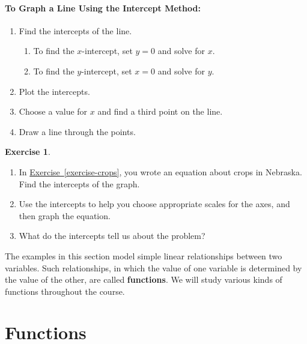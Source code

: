 \documentclass[10pt,]{book}
\newcommand{\terminology}[1]{\textbf{#1}}
\theoremstyle{plain}
\theoremstyle{definition}
\theoremstyle{definition}
\theoremstyle{definition}
\theoremstyle{definition}
\theoremstyle{definition}
\newtheorem{exercise}[theorem]{Exercise}
\numberwithin{equation}{section}
\begin{document}
\paragraph[To Graph a Line Using the Intercept Method:]{To Graph a Line Using the Intercept Method:}\label{paragraphs-4}
\leavevmode%
\begin{enumerate}[label=*\arabic**]
\item\hypertarget{li-64}{}Find the intercepts of the line.%
\begin{enumerate}[label=++\alph*]
\item\hypertarget{li-65}{}To find the \(x\)-intercept, set \(y=0\) and solve for \(x\).%
\item\hypertarget{li-66}{}To find the \(y\)-intercept, set \(x = 0\) and solve for \(y\).%
\end{enumerate}
\item\hypertarget{li-67}{}Plot the intercepts.%
\item\hypertarget{li-68}{}Choose a value for \(x\) and find a third point on the line.%
\item\hypertarget{li-69}{}Draw a line through the points.%
\end{enumerate}
\begin{exercise}\label{exercise-intercepts}
\leavevmode%
\begin{enumerate}[label=*\alph**]
\item\hypertarget{li-70}{}In \hyperref[exercise-crops]{Exercise~\ref{exercise-crops}}, you wrote an equation about crops in Nebraska. Find the intercepts of the graph.%
\item\hypertarget{li-71}{}Use the intercepts to help you choose appropriate scales for the axes, and then graph the equation.%
\item\hypertarget{li-72}{}What do the intercepts tell us about the problem?%
\end{enumerate}
\end{exercise}
\par
The examples in this section model simple linear relationships between two variables.
Such relationships, in which the value of one variable is determined by the value of the
other, are called \terminology{functions}. We will study various kinds of functions throughout the course.%
\typeout{************************************************}
\typeout{************************************************}
\section[Functions]{Functions}\label{functions}
\typeout{************************************************}
\typeout{************************************************}
\end{document}
